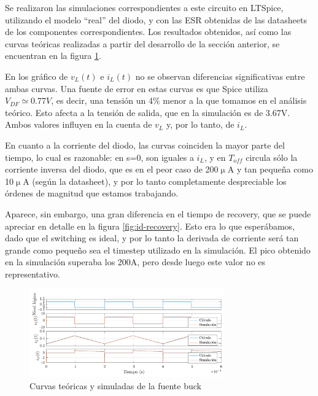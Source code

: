 \documentclass[e4_tp1_main.tex]{subfiles}
\begin{document}
Se realizaron las simulaciones correspondientes a este circuito en LTSpice, utilizando el modelo ``real'' del diodo, y con las ESR obtenidas de las datasheets de los componentes correspondientes. Los resultados obtenidos, as\'i como las curvas te\'oricas realizadas a partir del desarrollo de la secci\'on anterior, se encuentran en la figura \ref{fig:buck-curvas}.

En los gr\'afico de $v_L(t)$ e $i_L(t)$ no se observan diferencias significativas entre ambas curvas. Una fuente de error en estas curvas es que Spice utiliza $V_{DF} \simeq 0.77V$, es decir, una tensi\'on un 4\% menor a la que tomamos en el an\'alisis te\'orico. Esto afecta a la tensi\'on de salida, que en la simulaci\'on es de 3.67V. Ambos valores influyen en la cuenta de $v_L$ y, por lo tanto, de $i_L$.



En cuanto a la corriente del diodo, las curvas coinciden la mayor parte del tiempo, lo cual es razonable: en s=0, son iguales a $i_L$, y en $T_{off}$  circula s\'olo la corriente inversa del diodo, que es en el peor caso de 200$\upmu$A y tan peque\~na como 10$\upmu$A (seg\'un la datasheet), y por lo tanto completamente despreciable los \'ordenes de magnitud que estamos trabajando.


Aparece, sin embargo, una gran diferencia en el tiempo de recovery, que se puede apreciar en detalle en la figura \ref{fig:id-recovery}. Esto era lo que esper\'abamos, dado que el switching es ideal, y por lo tanto la derivada de corriente ser\'a tan grande como peque\~no sea el timestep utilizado en la simulaci\'on. El pico obtenido en la simulaci\'on superaba los 200A, pero desde luego este valor no es representativo. 


\begin{figure}[ht]
	\centering
	\includegraphics[width=0.75\textwidth]{images/ej2/curvas.pdf}
	\caption{Curvas te\'oricas y simuladas de la fuente buck}
	\label{fig:buck-curvas}
\end{figure}
\end{document}
